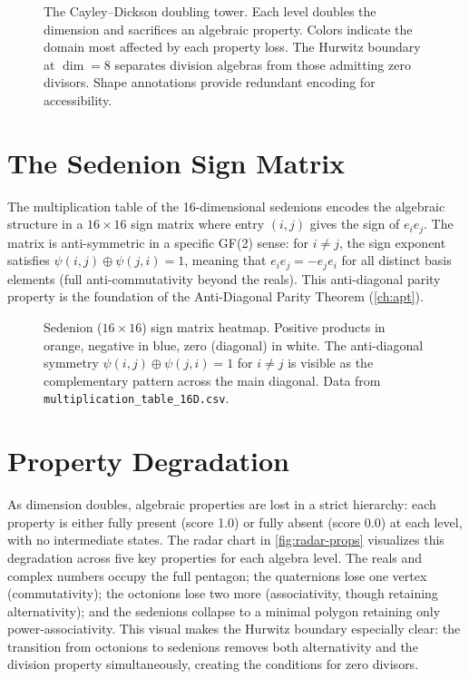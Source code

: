\documentclass[12pt,openany]{report}
\theoremstyle{definition}
\theoremstyle{plain}
\theoremstyle{remark}
\begin{document}
\begin{figure}[htbp]
\centering

\caption{The Cayley--Dickson doubling tower.  Each level doubles the
dimension and sacrifices an algebraic property.  Colors indicate the
domain most affected by each property loss.  The Hurwitz boundary at
$\dim=8$ separates division algebras from those admitting zero divisors.
Shape annotations provide redundant encoding for accessibility.}
\label{fig:cd-tower}
\end{figure}

\section{The Sedenion Sign Matrix}

The multiplication table of the 16-dimensional sedenions encodes the
algebraic structure in a $16 \times 16$ sign matrix where entry $(i,j)$
gives the sign of $e_i e_j$.  The matrix is anti-symmetric in a
specific GF(2) sense: for $i \neq j$, the sign exponent satisfies
$\psi(i,j) \oplus \psi(j,i) = 1$, meaning that
$e_i e_j = -e_j e_i$ for all distinct basis elements (full
anti-commutativity beyond the reals).  This anti-diagonal parity
property is the foundation of the Anti-Diagonal Parity Theorem
(\cref{ch:apt}).

\begin{figure}[htbp]
\centering

\caption{Sedenion ($16 \times 16$) sign matrix heatmap.  Positive products
in \textcolor{OIorange}{orange}, negative in \textcolor{OIblue}{blue},
zero (diagonal) in white.  The anti-diagonal symmetry
$\psi(i,j) \oplus \psi(j,i) = 1$ for $i \neq j$ is visible as the
complementary pattern across the main diagonal.  Data from
\texttt{multiplication\_table\_16D.csv}.}
\label{fig:sign-matrix}
\end{figure}

\section{Property Degradation}

As dimension doubles, algebraic properties are lost in a strict hierarchy:
each property is either fully present (score 1.0) or fully absent
(score 0.0) at each level, with no intermediate states.
The radar chart in \cref{fig:radar-props} visualizes this degradation
across five key properties for each algebra level.  The reals and
complex numbers occupy the full pentagon; the quaternions lose one vertex
(commutativity); the octonions lose two more (associativity, though
retaining alternativity); and the sedenions collapse to a minimal
polygon retaining only power-associativity.  This visual makes the
Hurwitz boundary especially clear: the transition from octonions to
sedenions removes both alternativity and the division property
simultaneously, creating the conditions for zero divisors.
\end{document}
